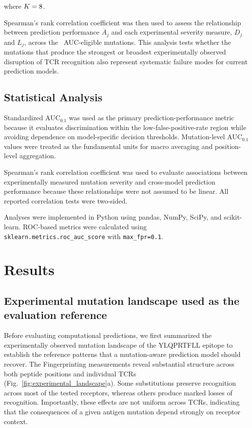 \documentclass{article}
\begin{document}
where $K=8$.

Spearman's rank correlation coefficient was then used to assess the
relationship between prediction performance $\overline{A}_j$ and each
experimental severity measure, $D_j$ and $L_j$, across the \valNeligible\ AUC-eligible
mutations. This analysis tests whether the mutations that produce the
strongest or broadest experimentally observed disruption of TCR recognition
also represent systematic failure modes for current prediction models.


\subsection{Statistical Analysis}
Standardized AUC$_{0.1}$ was used as the primary prediction-performance
metric because it evaluates discrimination within the low-false-positive-rate
region while avoiding dependence on model-specific decision thresholds.
Mutation-level AUC$_{0.1}$ values were treated as the fundamental units for
macro averaging and position-level aggregation.

Spearman's rank correlation coefficient was used to evaluate associations
between experimentally measured mutation severity and cross-model prediction
performance because these relationships were not assumed to be linear.
All reported correlation tests were two-sided.

Analyses were implemented in Python using pandas, NumPy, SciPy, and
scikit-learn. ROC-based metrics were calculated using
\texttt{sklearn.metrics.roc\_auc\_score} with
\texttt{max\_fpr=0.1}.


\section{Results}



\subsection{Experimental mutation landscape used as the evaluation reference}

Before evaluating computational predictions, we first summarized the
experimentally observed mutation landscape of the YLQPRTFLL epitope to
establish the reference patterns that a mutation-aware prediction model
should recover. The Fingerprinting measurements reveal substantial
structure across both peptide positions and individual TCRs
(Fig.~\ref{fig:experimental_landscape}a). Some substitutions preserve
recognition across most of the tested receptors, whereas others produce
marked losses of recognition. Importantly, these effects are not uniform
across TCRs, indicating that the consequences of a given antigen mutation
depend strongly on receptor context.
\end{document}
